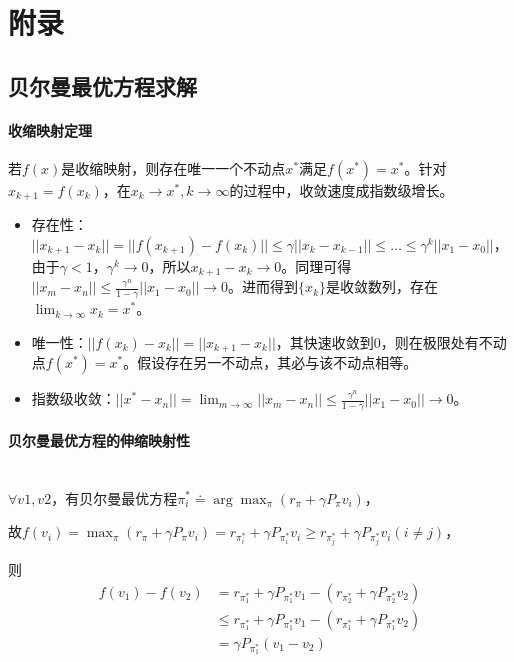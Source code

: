 \documentclass[
12pt, %
a4paper, 
oneside, %
headinclude,footinclude, %
]{scrartcl}
\begin{document}
\section{附录}
\subsection{贝尔曼最优方程求解}\label{sec:Scalability Mapping}
\paragraph{收缩映射定理}
若$ f(x) $是收缩映射，则存在唯一一个不动点$ x^* $满足$ f(x^*) = x^* $。针对$ x_{k + 1} = f(x_k) $，在$ x_k \to x^*, k \to \infty $的过程中，收敛速度成指数级增长。
\begin{itemize}
\item 存在性：$ ||x_{k + 1} - x_k|| = ||f(x_{k + 1}) - f(x_k)|| \leq \gamma||x_k - x_{k - 1}|| \leq \dots \leq \gamma^k||x_1 - x_0|| $，由于$ \gamma < 1 $，$ \gamma^k \to 0 $，所以$ x_{k + 1} - x_k \to 0 $。同理可得$ ||x_m - x_n|| \leq \frac{\gamma^n}{1 - \gamma}||x_1 - x_0|| \to 0 $。进而得到$ \{x_k\} $是收敛数列，存在$ \lim_{k \to \infty} x_k = x^* $。
\item 唯一性：$ ||f(x_k) - x_k|| = ||x_{k + 1} - x_k||$，其快速收敛到$ 0 $，则在极限处有不动点$ f(x^*) = x^* $。假设存在另一不动点，其必与该不动点相等。
\item 指数级收敛：$ ||x^* - x_n|| = \lim_{m \to \infty}||x_m - x_n|| \leq  \frac{\gamma^n}{1 - \gamma}||x_1 - x_0|| \to 0 $。
\end{itemize}
\paragraph{贝尔曼最优方程的伸缩映射性}~\\

$ \forall v1,v2 $，有贝尔曼最优方程$ \pi_i^* \doteq \arg \max_{\pi} (r_\pi + \gamma P_\pi v_i) $，

故$ f(v_i) = \max_{\pi} (r_\pi + \gamma P_\pi v_i) = r_{\pi_i^*} + \gamma P_{\pi_i^*} v_i \geq r_{\pi_j^*} + \gamma P_{\pi_j^*} v_i (i \neq j) $，

则
\begin{align*}
f(v_1) - f(v_2) 
&= r_{\pi_1^*} + \gamma P_{\pi_1^*} v_1 - (r_{\pi_2^*} + \gamma P_{\pi_2^*} v_2) \\
&\leq r_{\pi_1^*} + \gamma P_{\pi_1^*} v_1 - (r_{\pi_1^*} + \gamma P_{\pi_1^*} v_2) \\
&= \gamma P_{\pi_1^*} (v_1 - v_2)
\end{align*}
\end{document}

